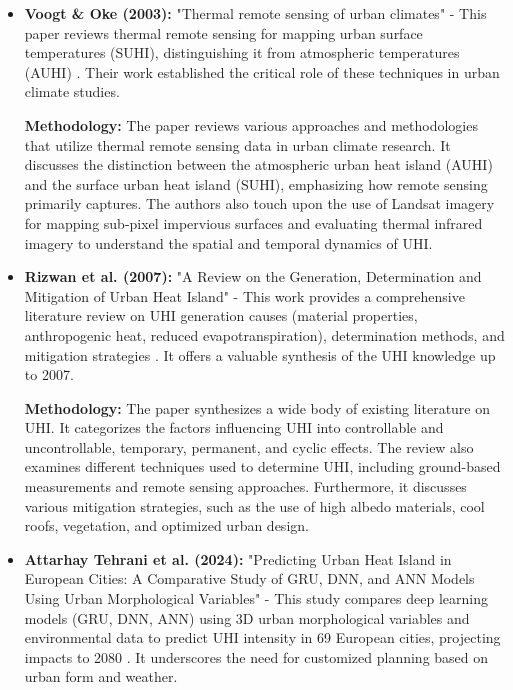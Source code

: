 \documentclass{article}
\begin{document}
\begin{itemize}
    \item \textbf{Voogt \& Oke (2003):} "{Thermal remote sensing of urban climates}" - This paper reviews thermal remote sensing for mapping urban surface temperatures (SUHI), distinguishing it from atmospheric temperatures (AUHI) \parencite{Voogt2003}. Their work established the critical role of these techniques in urban climate studies.

    \textbf{Methodology:} The paper reviews various approaches and methodologies that utilize thermal remote sensing data in urban climate research. It discusses the distinction between the atmospheric urban heat island (AUHI) and the surface urban heat island (SUHI), emphasizing how remote sensing primarily captures. The authors also touch upon the use of Landsat imagery for mapping sub-pixel impervious surfaces and evaluating thermal infrared imagery to understand the spatial and temporal dynamics of UHI.

    \vspace{0.3cm}

    \item \textbf{Rizwan et al. (2007):} "{A Review on the Generation, Determination and Mitigation of Urban Heat Island}" - This work provides a comprehensive literature review on UHI generation causes (material properties, anthropogenic heat, reduced evapotranspiration), determination methods, and mitigation strategies \parencite{Rizwan_2007}. It offers a valuable synthesis of the UHI knowledge up to 2007.

    \textbf{Methodology:} The paper synthesizes a wide body of existing literature on UHI. It categorizes the factors influencing UHI into controllable and uncontrollable, temporary, permanent, and cyclic effects. The review also examines different techniques used to determine UHI, including ground-based measurements and remote sensing approaches. Furthermore, it discusses various mitigation strategies, such as the use of high albedo materials, cool roofs, vegetation, and optimized urban design.

    \vspace{0.3cm}
    \item \textbf{Attarhay Tehrani et al. (2024):} "{Predicting Urban Heat Island in European Cities: A Comparative Study of GRU, DNN, and ANN Models Using Urban Morphological Variables}" -  This study compares deep learning models (GRU, DNN, ANN) using 3D urban morphological variables and environmental data to predict UHI intensity in 69 European cities, projecting impacts to 2080 \parencite{Tehrani_2024}. It underscores the need for customized planning based on urban form and weather.


\end{itemize}
\end{document}
